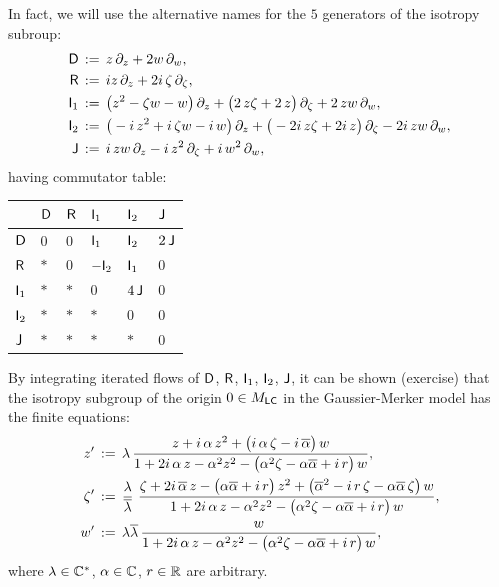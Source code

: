\documentclass[12pt,twoside,leqno,openany]{amsart}
\begin{document}
In fact, we will use the alternative names for the
$5$ generators of the isotropy subroup:
\[
\aligned
{\sf D}
&
\,:=\,
z\,\partial_z
+
2w\,\partial_w,
\\
{\sf R}
&
\,:=\,
iz\,\partial_z
+
2i\,\zeta\,\partial_\zeta,
\\
{\sf I}_1
&
\,:=\,
\big(z^2-\zeta w-w\big)\,
\partial_z
+
\big(2\,z\zeta+2\,z\big)\,\partial_\zeta
+
2\,zw\,\partial_w,
\\
{\sf I}_2
&
\,:=\,
\big(-i\,z^2+i\,\zeta w-i\,w\big)\,\partial_z
+
\big(-2i\,z\zeta+2i\,z\big)\,\partial_\zeta
-
2i\,zw\,\partial_w,
\\
{\sf J}
&
\,:=\,
i\,zw\,\partial_z
-
i\,z^2\,\partial_\zeta
+
i\,w^2\,\partial_w,
\endaligned
\]
having commutator table:
\begin{center}
\begin{tabular} [t] { l | l l l l l }
& ${\sf D}$ & ${\sf R}$ & ${\sf I}_1$ &
${\sf I}_2$ & ${\sf
J}$
\\
\hline
${\sf D}$ & $0$ & $0$ & ${\sf I}_1$ & ${\sf I}_2$ & $2\,{\sf J}$
\\
${\sf R}$ & $*$ & $0$ & $-{\sf I}_2$ & ${\sf I}_1$ & $0$
\\
${\sf I}_1$ & $*$ & $*$ & $0$ & $4\,{\sf J}$ & $0$
\\
${\sf I}_2$ & $*$ & $*$ & $*$ & $0$ & $0$
\\
${\sf J}$ & $*$ & $*$ & $*$ & $*$ & $0$ %
\end{tabular}
\end{center}

\label{fractional-representation-isotropy-group}

By integrating iterated flows of 
${\sf D}$, ${\sf R}$, ${\sf I}_1$, ${\sf I}_2$, ${\sf J}$, 
it can be shown (exercise) that the isotropy subgroup
of the origin $0 \in M_{\sf LC}$ in the Gaussier-Merker model 
has the finite equations:
\[
\aligned
z'
&
\,:=\,
\lambda\,
\frac{z+i\,\alpha\,z^2+
\big(i\,\alpha\,\zeta-i\,\overline{\alpha}\big)\,w}
{1+2i\,\alpha\,z-\alpha^2z^2
-
\big(\alpha^2\zeta-\alpha\overline{\alpha}+i\,r\big)\,w},
\\
\zeta'
&
\,:=\,
\frac{\lambda}{\overline{\lambda}}\,\,
\frac{\zeta+2i\,\overline{\alpha}\,z
-\big(\alpha\overline{\alpha}+i\,r\big)\,z^2
+\big(\overline{\alpha}^2-i\,r\,\zeta
-\alpha\overline{\alpha}\,\zeta\big)\,w}
{1+2i\,\alpha\,z-\alpha^2z^2
-
\big(\alpha^2\zeta-\alpha\overline{\alpha}+i\,r\big)\,w},
\\
w'
&
\,:=\,
\lambda\overline{\lambda}\,
\frac{w}
{1+2i\,\alpha\,z-\alpha^2z^2
-
\big(\alpha^2\zeta-\alpha\overline{\alpha}+i\,r\big)\,w},
\endaligned
\]
where $\lambda \in \mathbb{C}^\ast$, $\alpha \in \mathbb{C}$, $r \in \mathbb{R}$ are
arbitrary.
\end{document}
